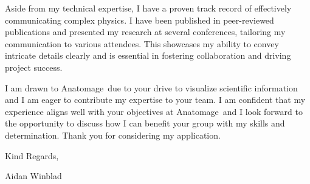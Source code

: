 \documentclass[12pt]{letter}
\newcommand{\myname}{Aidan Winblad} %
\newcommand{\mytitle}{Applicant} %
\newcommand{\closer}{Kind Regards} %
\newcommand{\company}{Anatomage} %
\begin{document}
Aside from my technical expertise, I have a proven track record of effectively communicating complex physics.
I have been published in peer-reviewed publications and presented my research at several conferences, tailoring my communication to various attendees.
This showcases my ability to convey intricate details clearly and is essential in fostering collaboration and driving project success.

I am drawn to \company\ due to your drive to visualize scientific information and I am eager to contribute my expertise to your team.
I am confident that my experience aligns well with your objectives at \company\, and I look forward to the opportunity to discuss how I can benefit your group with my skills and determination. Thank you for considering my application.

\vspace{0.1in}
\vfill

\begin{flushright}
\closer,

\myname\\
\end{flushright}
\end{document}
